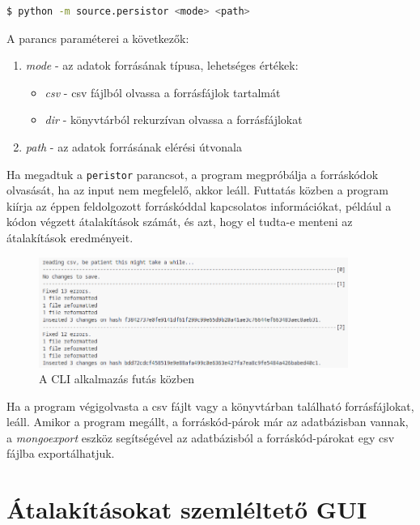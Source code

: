 \begin{lstlisting}[language=bash, numbers=none]
	$ python -m source.persistor <mode> <path>
\end{lstlisting}

A parancs paraméterei a következők:

\begin{enumerate}
	\item\label{step:first} \emph{mode} - az adatok forrásának típusa,
	lehetséges értékek:
	\begin{itemize}
		\item \emph{csv} - csv fájlból olvassa a forrásfájlok tartalmát
		\item \emph{dir} - könyvtárból rekurzívan olvassa a forrásfájlokat
	\end{itemize}
	\item \emph{path} - az adatok forrásának elérési útvonala
\end{enumerate}

Ha megadtuk a \lstinline{peristor} parancsot, a program megpróbálja a forráskódok olvasását,
ha az input nem megfelelő, akkor leáll.
Futtatás közben a program kiírja az éppen feldolgozott forráskóddal kapcsolatos információkat,
például a kódon végzett átalakítások számát, és azt, hogy el tudta-e menteni az átalakítások eredményeit.

\begin{figure}[H]
	\centering
	\includegraphics[width=0.9\textwidth,frame]{images/screenshots/log.png}
	\caption{A CLI alkalmazás futás közben}
\end{figure}

Ha a program végigolvasta a csv fájlt vagy a könyvtárban található forrásfájlokat, leáll.
Amikor a program megállt, a forráskód-párok már az adatbázisban vannak,
a \emph{mongoexport} eszköz segítségével az adatbázisból a forráskód-párokat
egy csv fájlba exportálhatjuk.

\section{Átalakításokat szemléltető GUI}

